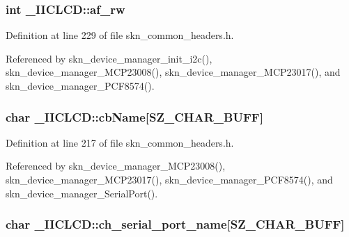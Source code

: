 \hypertarget{struct___i_i_c_l_c_d_ad0162f6a3e82c34192c0d901ef0ff6be}{}
\subsubsection[{af\+\_\+rw}]{\setlength{\rightskip}{0pt plus 5cm}int \+\_\+\+I\+I\+C\+L\+C\+D\+::af\+\_\+rw}\label{struct___i_i_c_l_c_d_ad0162f6a3e82c34192c0d901ef0ff6be}


Definition at line 229 of file skn\+\_\+common\+\_\+headers.\+h.



Referenced by skn\+\_\+device\+\_\+manager\+\_\+init\+\_\+i2c(), skn\+\_\+device\+\_\+manager\+\_\+\+M\+C\+P23008(), skn\+\_\+device\+\_\+manager\+\_\+\+M\+C\+P23017(), and skn\+\_\+device\+\_\+manager\+\_\+\+P\+C\+F8574().

\hypertarget{struct___i_i_c_l_c_d_a3f9347595482a6da5cb5d536d937a554}{}
\subsubsection[{cb\+Name}]{\setlength{\rightskip}{0pt plus 5cm}char \+\_\+\+I\+I\+C\+L\+C\+D\+::cb\+Name\mbox{[}{\bf S\+Z\+\_\+\+C\+H\+A\+R\+\_\+\+B\+U\+F\+F}\mbox{]}}\label{struct___i_i_c_l_c_d_a3f9347595482a6da5cb5d536d937a554}


Definition at line 217 of file skn\+\_\+common\+\_\+headers.\+h.



Referenced by skn\+\_\+device\+\_\+manager\+\_\+\+M\+C\+P23008(), skn\+\_\+device\+\_\+manager\+\_\+\+M\+C\+P23017(), skn\+\_\+device\+\_\+manager\+\_\+\+P\+C\+F8574(), and skn\+\_\+device\+\_\+manager\+\_\+\+Serial\+Port().

\hypertarget{struct___i_i_c_l_c_d_a2f193b0806fdbba1d644567835e2b2e8}{}
\subsubsection[{ch\+\_\+serial\+\_\+port\+\_\+name}]{\setlength{\rightskip}{0pt plus 5cm}char \+\_\+\+I\+I\+C\+L\+C\+D\+::ch\+\_\+serial\+\_\+port\+\_\+name\mbox{[}{\bf S\+Z\+\_\+\+C\+H\+A\+R\+\_\+\+B\+U\+F\+F}\mbox{]}}\label{struct___i_i_c_l_c_d_a2f193b0806fdbba1d644567835e2b2e8}


